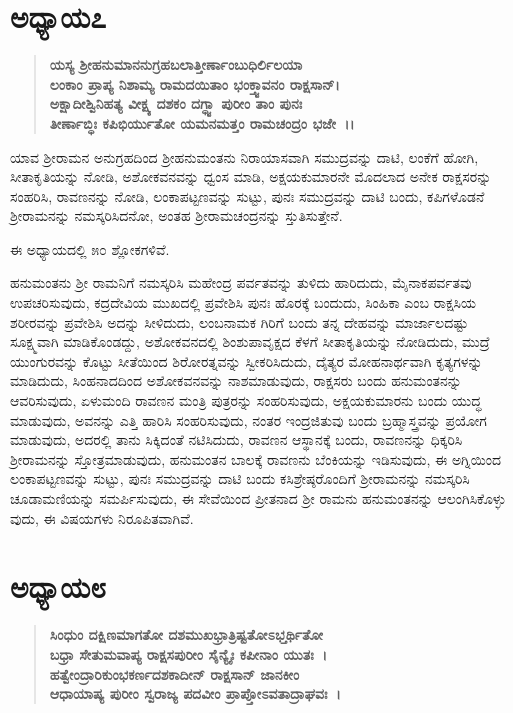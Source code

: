 \section*{ಅಧ್ಯಾಯ\enginline{-}೭}

\begin{verse}
\textbf{ಯಸ್ಯ ಶ‍್ರೀಹನುಮಾನನುಗ್ರಹಬಲಾತ್ತೀರ್ಣಾಂಬುಧಿರ್ಲಿಲಯಾ }\\\textbf{ ಲಂಕಾಂ ಪ್ರಾಪ್ಯ ನಿಶಾಮ್ಯ ರಾಮದಯಿತಾಂ ಭಂಕ್ತ್ವಾವನಂ ರಾಕ್ಷಸಾನ್।} \\\textbf{ ಅಕ್ಷಾದೀಶ್ವಿನಿಹತ್ಯ ವೀಕ್ಷ್ಯ ದಶಕಂ ದಗ್ಧ್ವಾ ಪುರೀಂ ತಾಂ ಪುನಃ}\\\textbf{ ತೀರ್ಣಾಬ್ಧಿಃ ಕಪಿಭಿರ್ಯುತೋ ಯಮನಮತ್ತಂ ರಾಮಚಂದ್ರಂ ಭಜೇ~।।}
\end{verse}

ಯಾವ ಶ‍್ರೀರಾಮನ ಅನುಗ್ರಹದಿಂದ ಶ‍್ರೀಹನುಮಂತನು ನಿರಾಯಾಸವಾಗಿ ಸಮುದ್ರವನ್ನು ದಾಟಿ, ಲಂಕೆಗೆ ಹೋಗಿ, ಸೀತಾಕೃತಿಯನ್ನು ನೋಡಿ, ಅಶೋಕವನವನ್ನು ಧ್ವಂಸ ಮಾಡಿ, ಅಕ್ಷಯಕುಮಾರನೇ ಮೊದಲಾದ ಅನೇಕ ರಾಕ್ಷಸರನ್ನು ಸಂಹರಿಸಿ, ರಾವಣನನ್ನು ನೋಡಿ, ಲಂಕಾಪಟ್ಟಣವನ್ನು ಸುಟ್ಟು, ಪುನಃ ಸಮುದ್ರವನ್ನು ದಾಟಿ ಬಂದು, ಕಪಿಗಳೊಡನೆ ಶ‍್ರೀರಾಮನನ್ನು ನಮಸ್ಕರಿಸಿದನೋ, ಅಂತಹ ಶ‍್ರೀರಾಮಚಂದ್ರನನ್ನು ಸ್ತುತಿಸುತ್ತೇನೆ.

ಈ ಅಧ್ಯಾಯದಲ್ಲಿ ೫೦ ಶ್ಲೋಕಗಳಿವೆ.

ಹನುಮಂತನು ಶ‍್ರೀ ರಾಮನಿಗೆ ನಮಸ್ಕರಿಸಿ ಮಹೇಂದ್ರ ಪರ್ವತವನ್ನು ತುಳಿದು ಹಾರಿದುದು, ಮೈನಾಕಪರ್ವತವು ಉಪಚರಿಸುವುದು, ಕದ್ರದೇವಿಯ ಮುಖದಲ್ಲಿ ಪ್ರವೇಶಿಸಿ ಪುನಃ ಹೊರಕ್ಕೆ ಬಂದುದು, ಸಿಂಹಿಕಾ ಎಂಬ ರಾಕ್ಷಸಿಯ ಶರೀರವನ್ನು ಪ್ರವೇಶಿಸಿ ಅದನ್ನು ಸೀಳಿದುದು, ಲಂಬನಾಮಕ ಗಿರಿಗೆ ಬಂದು ತನ್ನ ದೇಹವನ್ನು ಮಾರ್ಜಾಲದಷ್ಟು ಸೂಕ್ಷ್ಮವಾಗಿ ಮಾಡಿಕೊಂಡದ್ದು, ಅಶೋಕವನದಲ್ಲಿ ಶಿಂಶುಪಾವೃಕ್ಷದ ಕೆಳಗೆ ಸೀತಾಕೃತಿಯನ್ನು ನೋಡಿದುದು, ಮುದ್ರೆ ಯುಂಗುರವನ್ನು ಕೊಟ್ಟು ಸೀತೆಯಿಂದ ಶಿರೋರತ್ನವನ್ನು ಸ್ವೀಕರಿಸಿದುದು, ದೈತ್ಯರ ಮೋಹನಾರ್ಥವಾಗಿ ಕೃತ್ಯಗಳನ್ನು ಮಾಡಿದುದು, ಸಿಂಹನಾದದಿಂದ ಅಶೋಕವನವನ್ನು ನಾಶಮಾಡುವುದು, ರಾಕ್ಷಸರು ಬಂದು ಹನುಮಂತನನ್ನು ಆವರಿಸುವುದು, ಏಳುಮಂದಿ ರಾವಣನ ಮಂತ್ರಿ ಪುತ್ರರನ್ನು ಸಂಹರಿಸುವುದು, ಅಕ್ಷಯಕುಮಾರನು ಬಂದು ಯುದ್ಧ ಮಾಡುವುದು, ಅವನನ್ನು ಎತ್ತಿ ಹಾರಿಸಿ ಸಂಹರಿಸುವುದು, ನಂತರ ಇಂದ್ರಜಿತುವು ಬಂದು ಬ್ರಹ್ಮಾಸ್ತ್ರವನ್ನು ಪ್ರಯೋಗ ಮಾಡುವುದು, ಅದರಲ್ಲಿ ತಾನು ಸಿಕ್ಕಿದಂತೆ ನಟಿಸಿದುದು, ರಾವಣನ ಆಸ್ಥಾನಕ್ಕೆ ಬಂದು, ರಾವಣನನ್ನು ಧಿಕ್ಕರಿಸಿ ಶ‍್ರೀರಾಮನನ್ನು ಸ್ತೋತ್ರಮಾಡುವುದು, ಹನುಮಂತನ ಬಾಲಕ್ಕೆ ರಾವಣನು ಬೆಂಕಿಯನ್ನು ಇಡಿಸುವುದು, ಈ ಅಗ್ನಿಯಿಂದ ಲಂಕಾಪಟ್ಟಣವನ್ನು ಸುಟ್ಟು, ಪುನಃ ಸಮುದ್ರವನ್ನು ದಾಟಿ ಬಂದು ಕಸಿಶ್ರೇಷ್ಠರೊಂದಿಗೆ ಶ‍್ರೀರಾಮನನ್ನು ನಮಸ್ಕರಿಸಿ ಚೂಡಾಮಣಿಯನ್ನು ಸಮರ್ಪಿಸುವುದು, ಈ ಸೇವೆಯಿಂದ ಪ್ರೀತನಾದ ಶ‍್ರೀ ರಾಮನು ಹನುಮಂತನನ್ನು ಆಲಂಗಿಸಿಕೊಳ್ಳು ವುದು, ಈ ವಿಷಯಗಳು ನಿರೂಪಿತವಾಗಿವೆ.


\section*{ಅಧ್ಯಾಯ\enginline{-}೮}

\begin{verse}
\textbf{ಸಿಂಧುಂ ದಕ್ಷಿಣಮಾಗತೋ ದಶಮುಖಭ್ರಾತ್ರಿಷ್ಟತೋಽಭ್ತರ್ಥಿತೋ} \\\textbf{ ಬಧ್ರಾ ಸೇತುಮವಾಪ್ಯ ರಾಕ್ಷಸಪುರೀಂ ಸೈನ್ಯೈಃ ಕಪೀನಾಂ ಯುತಃ~। }\\\textbf{ಹತ್ವೇಂದ್ರಾರಿಕುಂಭಕರ್ಣದಶಕಾದೀನ್ ರಾಕ್ಷಸಾನ್ ಜಾನಕೀಂ }\\\textbf{ ಆಧಾಯಾಷ್ಯ ಪುರೀಂ ಸ್ವರಾಜ್ಯ ಪದವೀಂ ಪ್ರಾಪ್ತೋಽವತಾದ್ರಾಘವಃ~।}
\end{verse}

